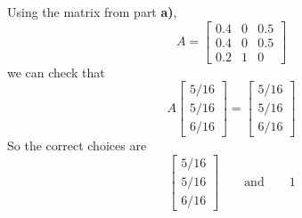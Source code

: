 \documentclass[11pt]{article}
\begin{document}
\begin{prob}[(12 pts)]
\begin{subprob}
\begin{solution}
Using the matrix from part \textbf{a)},
\[
A = \begin{bmatrix} 0.4 & 0 & 0.5 \\ 0.4 & 0 & 0.5 \\ 0.2 & 1 & 0 \end{bmatrix}
\]
we can check that
\[
A\begin{bmatrix} 5/16 \\ 5/16 \\ 6/16 \end{bmatrix}
=
\begin{bmatrix} 5/16 \\ 5/16 \\ 6/16 \end{bmatrix}
\]
So the correct choices are
\[
\boxed{\begin{bmatrix} 5/16 \\ 5/16 \\ 6/16 \end{bmatrix}}
\qquad \text{and} \qquad
\boxed{1}
\]
\end{solution}
\end{subprob}




\end{prob}

\newpage
\end{document}
